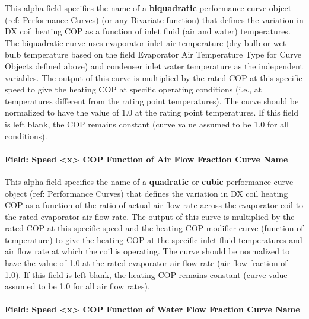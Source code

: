 This alpha field specifies the name of a \textbf{biquadratic} performance curve object (ref: Performance Curves) (or any Bivariate function) that defines the variation in DX coil heating COP as a function of inlet fluid (air and water) temperatures.
The biquadratic curve uses evaporator inlet air temperature (dry-bulb or wet-bulb temperature based on the field Evaporator Air Temperature Type for Curve Objects defined above) and condenser inlet water temperature as the independent variables.
The output of this curve is multiplied by the rated COP at this specific speed to give the heating COP at specific operating conditions (i.e., at temperatures different from the rating point temperatures). The curve should be normalized to have the value of 1.0 at the rating point temperatures. If this field is left blank, the COP remains constant (curve value assumed to be 1.0 for all conditions).


\paragraph{Field: Speed \textless{}x\textgreater{} COP Function of Air Flow Fraction Curve Name}\label{vshpwhheating-speed-x-cop-function-of-air-flow-fraction-curve-name}

This alpha field specifies the name of a \textbf{quadratic} or \textbf{cubic} performance curve object (ref: Performance Curves) that defines the variation in DX coil heating COP as a function of the ratio of actual air flow rate across the evaporator coil to the rated evaporator air flow rate.
The output of this curve is multiplied by the rated COP at this specific speed and the heating COP modifier curve (function of temperature) to give the heating COP at the specific inlet fluid temperatures and air flow rate at which the coil is operating. The curve should be normalized to have the value of 1.0 at the rated evaporator air flow rate (air flow fraction of 1.0). If this field is left blank, the heating COP remains constant (curve value assumed to be 1.0 for all air flow rates).


\paragraph{Field: Speed \textless{}x\textgreater{} COP Function of Water Flow Fraction Curve Name}\label{vshpwhheating-speed-x-cop-function-of-water-flow-fraction-curve-name}

